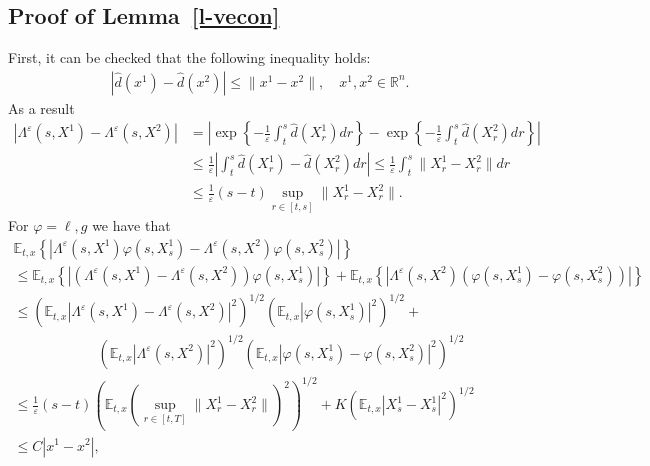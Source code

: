 \documentclass[11pt,reqno]{amsart}
\numberwithin{equation}{section}
\begin{document}
\subsection{Proof of Lemma~\ref{l-vecon}}
  First, it can be checked that the following inequality holds:
  $$\begin{array}{ll}
    |\hat d(x^1) - \hat d(x^2) | \le \|x^1 - x^2\|, \quad x^1, x^2
    \in \mathbb{R}^n.
  \end{array}$$
 As a result
  \begin{equation*}
  \begin{split}
    |\Lambda^\varepsilon (s, X^1) - \Lambda^\varepsilon (s, X^2)| 
    &= \displaystyle\left|\exp\left\{ - \frac 1 \varepsilon \int_t^s \hat
    d(X^1_r) dr\right\} - \exp \left\{- \frac 1 \varepsilon \int_t^s
    \hat d(X^2_r) dr\right\}\right| \\ 
    &\le\displaystyle \frac 1 \varepsilon \left|\int_t^s \hat d(X^1_r)
    - \hat d(X^2_r) dr \right|  
    \le\displaystyle \frac 1 \varepsilon \int_t^s \|X^1_r - X^2_r\| dr
    \\ &\displaystyle \le \frac 1 \varepsilon (s-t) \sup_{r\in [t,s]}
    \|X^1_r - X^2_r\|. 
  \end{split}
  \end{equation*}
  For $\varphi  = \ell, g$ we have that
  \begin{equation*}
  \begin{array}{ll}
    \displaystyle \mathbb{E}_{t,x} \left\{|\Lambda^\varepsilon (s, X^1)
    \varphi(s,X^1_s) - \Lambda^\varepsilon (s,X^2) \varphi(s,
    X^2_s)|\right \}\\ 
    \displaystyle \le \mathbb{E}_{t,x} \left\{|(\Lambda^\varepsilon(s, X^1) - \Lambda^\varepsilon
    (s, X^2)) \varphi(s, X^1_s)| \right\}+ \mathbb{E}_{t,x} \left\{|\Lambda^\varepsilon
    (s, X^2) (\varphi(s,X^1_s) - \varphi(s, X^2_s))|\right\}\\
    \displaystyle \le \left(\mathbb{E}_{t,x} |\Lambda^\varepsilon(s, X^1) - \Lambda^\varepsilon
    (s, X^2)|^2\right)^{1/2} \left(\mathbb{E}_{t,x}|\varphi(s, X^1_s)|^2\right)^{1/2} + \\
    \hspace{1in}   \left(\mathbb{E}_{t,x} |\Lambda^\varepsilon 
    (s, X^2)|^2\right)^{1/2}  \left( \mathbb{E}_{t,x} |\varphi(s,X^1_s) - \varphi(s,
    X^2_s)|^2\right)^{1/2} \\
    \le \displaystyle \frac{1}{\varepsilon}(s-t) \left(\mathbb{E}_{t,x} (\sup_{r\in [t,T]}
    \|X^1_r - X^2_r\| )^2\right)^{1/2} + K \left(\mathbb{E}_{t,x} |X^1_s - X^1_s
    |^{2}\right)^{1/2}\\ 
    \le C |x^1 - x^2|,
  \end{array}\end{equation*}
\end{document}
